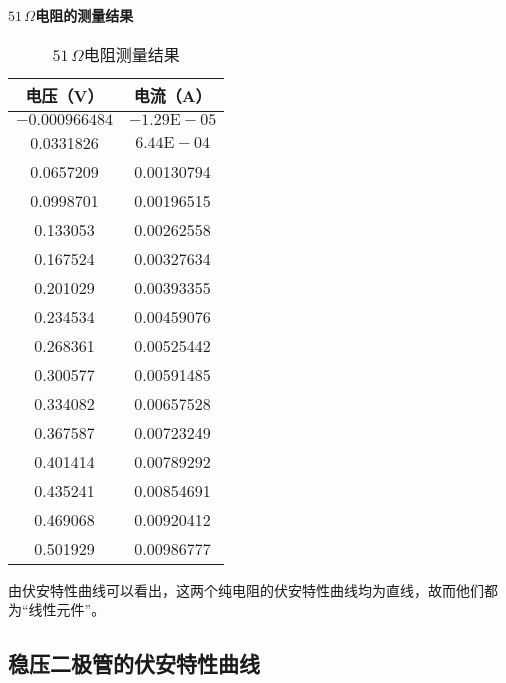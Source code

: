 \documentclass[UTF8]{article}
\theoremstyle{MyLineTheoremStyle} %
\theoremstyle{MyBlockTheoremStyle} %
\theoremstyle{MySubsubsectionStyle} %
\begin{document}
\textbf{$ 51\,\Omega $电阻的测量结果}
\begin{table}[H]
    \centering
    \begin{tabular}{|c|c|}
        \hline
        电压（V） & 电流（A）\\
        \hline
        $ -0.000966484 $ & $ -1.29\mathrm E-05 $\\
        \hline
        0.0331826 & $ 6.44\mathrm E-04 $\\
        \hline
        0.0657209 & 0.00130794\\
        \hline
        0.0998701 & 0.00196515\\
        \hline
        0.133053 & 0.00262558\\
        \hline
        0.167524 & 0.00327634\\
        \hline
        0.201029 & 0.00393355\\
        \hline
        0.234534 & 0.00459076\\
        \hline
        0.268361 & 0.00525442\\
        \hline
        0.300577 & 0.00591485\\
        \hline
        0.334082 & 0.00657528\\
        \hline
        0.367587 & 0.00723249\\
        \hline
        0.401414 & 0.00789292\\
        \hline
        0.435241 & 0.00854691\\
        \hline
        0.469068 & 0.00920412\\
        \hline
        0.501929 & 0.00986777\\
        \hline
    \end{tabular}
    \caption{\small $ 51\,\Omega $电阻测量结果}
\end{table}


由伏安特性曲线可以看出，这两个纯电阻的伏安特性曲线均为直线，故而他们都为“线性元件”。

\subsection{稳压二极管的伏安特性曲线}
\end{document}
